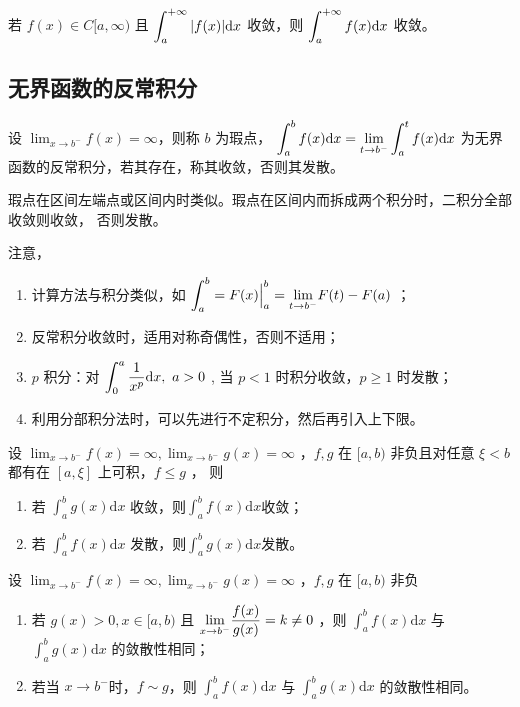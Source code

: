\begin{Theo}[绝对收敛必收敛]

    若 $ f(x) \in C[a,\infty) $ 且 $ \displaystyle \int_a^{+\infty}|f(x)|\mathrm{d}x $ 收敛，则
    $ \displaystyle \int_a^{+\infty}f(x)\mathrm{d}x $ 收敛。
\end{Theo}

\subsection{无界函数的反常积分}

设 $ {\displaystyle\lim_{x\rightarrow b^-}}f(x) = \infty $，则称 $ b $ 为瑕点，
$ \displaystyle \int_a^b f(x)\mathrm{d}x = {\displaystyle\lim_{t\rightarrow b^-}}
\int_a^t f(x)\mathrm{d}x $ 为无界函数的反常积分，若其存在，称其收敛，否则其发散。

瑕点在区间左端点或区间内时类似。瑕点在区间内而拆成两个积分时，二积分全部收敛则收敛，
否则发散。

注意，
\begin{enumerate}
    \item 计算方法与积分类似，如 $\displaystyle \int_a^{b} = F(x)\Big|^{b}_a = 
    {\displaystyle\lim_{t\rightarrow b^-}}F(t) - F(a) $ ；
    \item 反常积分收敛时，适用对称奇偶性，否则不适用；
    \item $ p $ 积分：对 $ \displaystyle \int_0^{a}\dfrac{1}{x^p}\mathrm{d}x,\ a>0 $ ,
    当 $ p < 1 $ 时积分收敛，$ p\geq 1 $ 时发散；
    \item 利用分部积分法时，可以先进行不定积分，然后再引入上下限。
\end{enumerate}

\begin{Theo}[比较判别法]

    设 $ {\displaystyle\lim_{x\rightarrow b^-}}f(x) = \infty,{\displaystyle\lim_{x\rightarrow b^-}}
    g(x) = \infty $ ，$ f,g $ 在 $ [a,b) $ 非负且对任意 $ \xi < b $ 都有在 $ [a,\xi] $ 上可积，$ f\leq g $ ，
    则\begin{enumerate}
        \item 若 $ \int_a^{b}g(x)\mathrm{d}x $ 收敛，则$ \int_a^{b}f(x)\mathrm{d}x $收敛；
        \item 若 $ \int_a^{b}f(x)\mathrm{d}x $ 发散，则$ \int_a^{b}g(x)\mathrm{d}x $发散。
    \end{enumerate}
\end{Theo}

\begin{Theo}[比较判别法]

    设 $ {\displaystyle\lim_{x\rightarrow b^-}}f(x) = \infty,{\displaystyle\lim_{x\rightarrow b^-}}
    g(x) = \infty $ ，$ f,g $ 在 $ [a,b) $ 非负
    \begin{enumerate}
        \item 若 $ g(x) > 0, x\in[a,b) $ 且 $ \displaystyle {\displaystyle\lim_{x\rightarrow b^-}}
        \dfrac{f(x)}{g(x)} = k \neq 0 $ ，则 $ \int_a^{b}f(x)\mathrm{d}x $ 与
        $ \int_a^{b}g(x)\mathrm{d}x $ 的敛散性相同；
        \item 若当 $ x\rightarrow b^- $时，$ f\sim g $，则 $ \int_a^{b}f(x)\mathrm{d}x $ 与
        $ \int_a^{b}g(x)\mathrm{d}x $ 的敛散性相同。
    \end{enumerate}
\end{Theo}

